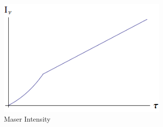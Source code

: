\documentclass{article}
\begin{document}
\begin{figure}
    \centering
    \includegraphics[width=0.75\textwidth]{MaserIntensity.png}
    \caption{Maser Intensity}
    \label{fig:maserintensity}
\end{figure}
\end{document}

